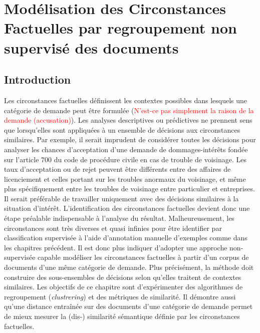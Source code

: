  \chapter{Modélisation des Circonstances Factuelles par regroupement non supervisé des documents}
\label{chap:similarite}

% 

\section{Introduction}
\label{sec:similarite:introduction}
Les circonstances factuelles définissent les contextes possibles dans lesquels une catégorie de demande peut être formulée (\textcolor{red}{N'est-ce pas simplement la raison de la demande (accusation)}). Les analyses descriptives ou prédictives ne prennent sens que lorsqu'elles sont appliquées à un ensemble de décisions aux circonstances similaires. Par exemple, il serait imprudent de considérer toutes les décisions pour analyser les chances d'acceptation d'une demande de dommages-intérêts fondée sur l'\og article 700 du code de procédure civile \fg{} en cas de trouble de voisinage. Les taux d'acceptation ou de rejet peuvent être différents entre des affaires de licenciement et celles portant sur les troubles anormaux du voisinage, et même plus spécifiquement entre les troubles de voisinage entre particulier et entreprises. %
 Il serait préférable de travailler uniquement avec des décisions similaires à la situation d'intérêt. L'identification des circonstances factuelles devient donc une étape préalable indispensable à l'analyse du résultat. Malheureusement, les circonstances sont très diverses et quasi infinies pour être identifier par classification supervisée à l'aide d'annotation manuelle d'exemples comme dans les chapitres précédent. Il est donc plus indiquer d'adopter une approche non-supervisée capable modéliser les circonstances factuelles à partir d'un corpus de documents d'une même catégorie de demande. Plus précisément, la méthode doit construire des sous-ensembles de décisions selon qu'elles traitent de contextes similaires.  Les objectifs de ce chapitre sont d'expérimenter des algorithmes  de regroupement (\textit{clustrering}) et des métriques de similarité. Il démontre aussi qu'une distance entraînée  sur des documents d'une catégorie de demande permet de mieux mesurer la (dis-) similarité sémantique définie par les circonstances factuelles.

